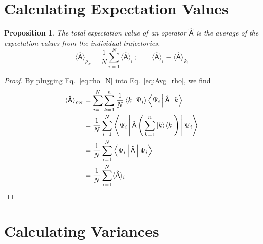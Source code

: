 \documentclass[letter,aps,pra,onecolumn,noshowpacs,superscriptaddress,preprintnumbers, kamsmath,amssymb]{revtex4}
\newcommand{\Avg}[1]{\langle#1\rangle}
\renewcommand{\Bra}[1]{\left\langle #1 \right\vert}
\newcommand{\KetBra}[2]{\Ket{#1}\kern-0.1em\Bra{#2}}
\renewcommand{\Ket}[1]{\left\vert #1 \right\rangle}
\newcommand{\Op}[1]{\ensuremath{\mathsf{\hat{#1}}}}
\newtheorem{proposition}{Proposition}
\begin{document}
\section{Calculating Expectation Values}

\begin{proposition}
  The total expectation value of an operator $\Op{A}$ is the average of the
  expectation values from the individual trajectories.
  \begin{equation}
    \Avg{\Op{A}}_{\rho_N}
    = \frac{1}{N} \sum_{i=1}^N \Avg{\Op{A}}_i\,;
    \qquad
    \Avg{\Op{A}}_i \equiv \Avg{\Op{A}}_{\Psi_i}
  \end{equation}
\end{proposition}
\begin{proof}
  By plugging Eq.~\eqref{eq:rho_N} into Eq.~\eqref{eq:Avg_rho}, we find
  \begin{equation}
    \begin{split}
    \Avg{\Op{A}}_{\rho_N}
    & = \sum_{i=1}^N \sum_{k=1}^{n} \frac{1}{N}
         \Braket{k | \Psi_i} \Braket{\Psi_i | \Op{A} | k} \\
    & = \frac{1}{N} \sum_{i=1}^N \Braket{\Psi_i |
         \Op{A} \left(\,\sum_{k=1}^{n} \KetBra{k}{k}\right)
        | \Psi_i} \\
    & = \frac{1}{N} \sum_{i=1}^N \Braket{\Psi_i | \Op{A} | \Psi_i} \\
    & = \frac{1}{N} \sum_{i=1}^N \Avg{\Op{A}}_i
    \end{split}
    \label{eq:avg_proof}
  \end{equation}
\end{proof}


\section{Calculating Variances}
\end{document}
